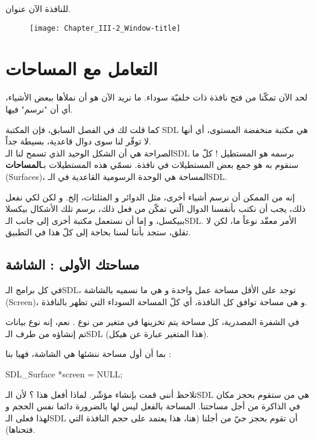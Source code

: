 للنافذة الآن عنوان.

\begin{figure}[H]
	\centering
	\texttt{[image: Chapter\_III-2\_Window-title]}
\end{figure}

\section{التعامل مع المساحات}

لحد الآن تمكّنا من فتح نافذة ذات خلفيّة سوداء. ما نريد الآن هو أن نملأها ببعض الأشياء، أي أن "نرسم" فيها.

كما قلت لك في الفصل السابق، فإن المكتبة
\textenglish{SDL}
هي مكتبة منخفضة المستوى، أي أنها لا توفّر لنا سوى دوال قاعدية، بسيطة جداً.\\
الصراحة هي أن الشكل الوحيد الذي تسمح لنا الـ\textenglish{SDL}
برسمه هو المستطيل ! كلّ ما سنقوم به هو جمع بعض المستطيلات في نافذة. نسمّي هذه المستطيلات بـ\textbf{المساحات}
(\textenglish{Surfaces})،
المساحة هي الوحدة الرسومية القاعدية في الـ\textenglish{SDL}.

\begin{information}
إنه من الممكن أن نرسم أشياء أخرى، مثل الدوائر و المثلثات، إلخ. و لكن لكي نفعل ذلك، يجب أن نكتب بأنفسنا الدوال الّتي تمكّن من فعل ذلك، برسم تلك الأشكال بيكسلا ببيكسل، و إما أن نستعمل مكتبة أخرى إلى جانب الـ\textenglish{SDL}.
الأمر معقّد نوعاً ما، لكن لا تقلق، ستجد بأننا لسنا بحاجة إلى كلّ هذا في التطبيق.
\end{information}

\subsection{مساحتك الأولى : الشاشة}

في كل برامج الـ\textenglish{SDL}،
توجد على الأقل مساحة عمل واحدة و هي ما نسميه بالشاشة 
(\textenglish{Screen})،
و هي مساحة توافق كل النافذة، أي كلّ المساحة السوداء التي تظهر بالنافذة.

في الشفرة المصدرية، كل مساحة يتم تخزينها في متغير من نوع
.
نعم، إنه نوع بيانات تم إنشاؤه من طرف الـ\textenglish{SDL}
(هذا المتغير عبارة عن هيكل).

بما أن أول مساحة ننشئها هي الشاشة، فهيا بنا :

\begin{Csource}
SDL_Surface *screen = NULL;
\end{Csource}

تلاحظ أنني قمت بإنشاء مؤشّر. لماذا أفعل هذا ؟ لأن الـ\textenglish{SDL}
هي من ستقوم بحجز مكان في الذاكرة من أجل مساحتنا. المساحة بالفعل ليس لها بالضرورة دائما نفس الحجم و لهذا فعلى الـ\textenglish{SDL}
أن تقوم بحجز حيّ من أجلنا (هنا، هذا يعتمد على حجم النافذة التي فتحناها).

